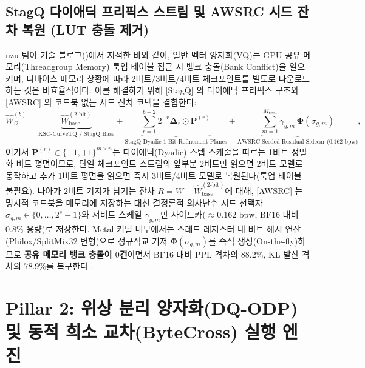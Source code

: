 \documentclass[10pt,a4paper]{article}
\begin{document}
\subsection{\textsf{StagQ} 다이애딕 프리픽스 스트림 및 \textsf{AWSRC} 시드 잔차 복원 (LUT 충돌 제거)}
\textsf{uzu} 팀이 기술 블로그(\cite{mirai2026quant})에서 지적한 바와 같이, 일반 벡터 양자화(VQ)는 GPU 공유 메모리(Threadgroup Memory) 룩업 테이블 접근 시 뱅크 충돌(Bank Conflict)을 일으키며, 디바이스 메모리 상황에 따라 2비트/3비트/4비트 체크포인트를 별도로 다운로드하는 것은 비효율적이다. 이를 해결하기 위해 [StagQ] \cite{wei2026stagq}의 다이애딕 프리픽스 구조와 [AWSRC] \cite{liu2026awsrc}의 코드북 없는 시드 잔차 코덱을 결합한다:
\begin{equation}
\widehat{W}_{\Omega}^{(b)} = \underbrace{\widehat{W}_{\text{base}}^{(2\text{-bit})}}_{\text{KSC-CurveTQ / StagQ Base}} + \underbrace{\sum_{r=1}^{b-2} 2^{-r} \mathbf{\Delta}_r \odot \mathbf{P}^{(r)}}_{\text{StagQ Dyadic 1-Bit Refinement Planes}} + \underbrace{\sum_{m=1}^{M_{\text{seed}}} \gamma_{g,m} \, \mathbf{\Phi}(\sigma_{g,m})}_{\text{AWSRC Seeded Residual Sidecar ($0.162\text{ bpw}$)}},
\label{eq:stagq_awsrc}
\end{equation}
여기서 $\mathbf{P}^{(r)} \in \{-1, +1\}^{m \times n}$는 다이애딕(Dyadic) 스텝 스케줄을 따르는 1비트 정밀화 비트 평면이므로, 단일 체크포인트 스트림의 앞부분 2비트만 읽으면 2비트 모델로 동작하고 추가 1비트 평면을 읽으면 즉시 3비트/4비트 모델로 복원된다(룩업 테이블 불필요). 나아가 2비트 기저가 남기는 잔차 $R = W - \widehat{W}_{\text{base}}^{(2\text{-bit})}$에 대해, [AWSRC] \cite{liu2026awsrc}는 명시적 코드북을 메모리에 저장하는 대신 결정론적 의사난수 시드 선택자 $\sigma_{g,m} \in \{0,\dots,2^{s}-1\}$와 저비트 스케일 $\gamma_{g,m}$만 사이드카($\approx 0.162\text{ bpw}$, BF16 대비 $0.8\%$ 용량)로 저장한다. Metal 커널 내부에서는 스레드 레지스터 내 비트 해시 연산(Philox/SplitMix32 변형)으로 정규직교 기저 $\mathbf{\Phi}(\sigma_{g,m})$를 즉석 생성(On-the-fly)하므로 \textbf{공유 메모리 뱅크 충돌이 $0$건}이면서 BF16 대비 PPL 격차의 $88.2\%$, KL 발산 격차의 $78.9\%$를 복구한다 \cite{liu2026awsrc}.

\section{Pillar 2: 위상 분리 양자화(DQ-ODP) 및 동적 희소 교차(ByteCross) 실행 엔진}
\end{document}
